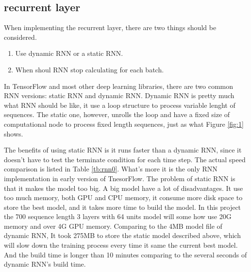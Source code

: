 \subsection{recurrent layer}
When implementing the recurrent layer, there are two things should be considered. 
\begin{enumerate}
   \item Use dynamic RNN or a static RNN.
   \item When shoul RNN stop calculating for each batch.
\end{enumerate}
In TensorFlow and most other deep learning libraries, there are two common RNN versions: static RNN and dynamic RNN. Dynamic RNN is pretty much what RNN should be like, it use a loop structure to process variable lenght of sequences. The static one, however, unrolls the loop and have a fixed size of computational node to process fixed length sequences, just as what Figure \ref{fig:1} shows. \par
The benefits of using static RNN is it runs faster than a dynamic RNN, since it doesn't have to test the terminate condition for each time step. The actual speed comparison is listed in Table \ref{tb:rnn0}. What's more it is the only RNN implementation in early version of TnesorFlow. The problem of static RNN is that it makes the model too big. A big model have a lot of disadvantages. It use too much memory, both GPU and CPU memory, it consume more disk space to store the best model, and it takes more time to build the model. In this project the 700  sequence length 3 layers with 64 units model will some how use 20G memory and over 4G GPU memory. Comparing to the 4MB model file of dynamic RNN, It took 275MB to store the static model described above, which will slow down the training process every time it same the current best model. And the build time is longer than 10 minutes comparing to the several seconds of dynamic RNN's build time.\par

